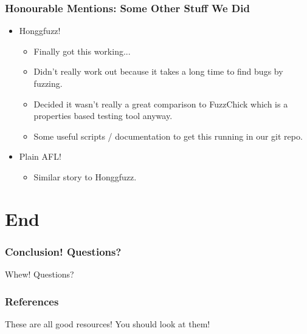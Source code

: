 \documentclass{beamer}
\begin{document}
\begin{frame}
  \frametitle{Honourable Mentions: Some Other Stuff We Did}

  \begin{itemize}
    \pause
  \item Honggfuzz!
    \pause
    \begin{itemize}
    \item Finally got this working...
    \item Didn't really work out because it takes a long time to find
      bugs by fuzzing.
    \item Decided it wasn't really a great comparison to FuzzChick
      which is a properties based testing tool anyway.
    \item Some useful scripts / documentation to get this running in
      our git repo. \cite{quick700}
    \end{itemize}
    \pause
  \item Plain AFL!
    \pause
    \begin{itemize}
    \item Similar story to Honggfuzz.
    \end{itemize}
  \end{itemize}
\end{frame}

\section{End}

\begin{frame}
  \frametitle{Conclusion! Questions?}

  \huge{Whew! Questions?}
\end{frame}

\begin{frame}
  \frametitle{References}

  \nocite{*}
  \printbibliography

  These are all good resources! You should look at them!
\end{frame}
\end{document}
